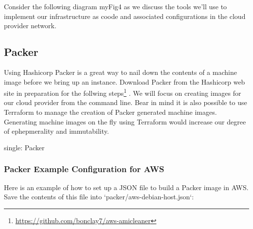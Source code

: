 Consider the following diagram {myFig4} as we discuss the tools we'll
use to implement our infrastructure as coode and associated
configurations in the cloud provider network.

\hypertarget{packer}{%
   \subsection{Packer}\label{packer}}

Using Hashicorp Packer is a great way to nail down the contents of a
machine image before we bring up an instance. Download Packer from the
Hashicorp web site in preparation for the follwing steps\footnote{\url{https://github.com/bonclay7/aws-amicleaner}}
. We will focus on creating images for our cloud provider from the
command line. Bear in mind it is also possible to use Terraform to
manage the creation of Packer generated machine images. Generating
machine images on the fly using Terraform would increase our degree of
ephepmerality and immutability.

single: Packer

\hypertarget{packer-example-configuration-for-aws}{%
   \subsubsection{Packer Example Configuration for
      AWS}\label{packer-example-configuration-for-aws}}

Here is an example of how to set up a JSON file to build a Packer image
in AWS. Save the contents of this file into
`packer/aws-debian-host.json`:

